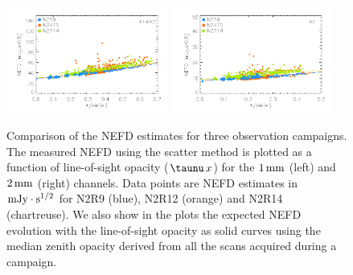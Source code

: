 \begin{figure}[!thbp]
\begin{center}
\includegraphics[clip=true,width=0.47\textwidth]{Figures/plot_nefd_vs_obstau_corrected_skydip_vfinal_1mm.pdf}
\includegraphics[clip=true,width=0.47\textwidth]{Figures/plot_nefd_vs_obstau_corrected_skydip_vfinal_a2.pdf}
\caption{Comparison of the NEFD estimates for three observation
  campaigns. The measured NEFD using the scatter method is plotted as a function of
  line-of-sight opacity ($\taunu\,x$) for the $1\,\rm{mm}$ (left) and $2\,\rm{mm}$ (right)
  channels. Data points are NEFD estimates in $\rm{mJy}\cdot s^{1/2}$ for N2R9 (blue), N2R12 (orange)
  and N2R14 (chartreuse). We also show in the plots the expected NEFD evolution
  with the line-of-sight opacity as solid curves using the median
  zenith opacity derived from all the scans acquired during a campaign.}
\label{fig:nefdvsbackground_below_1Jy}
\end{center}
\end{figure}

